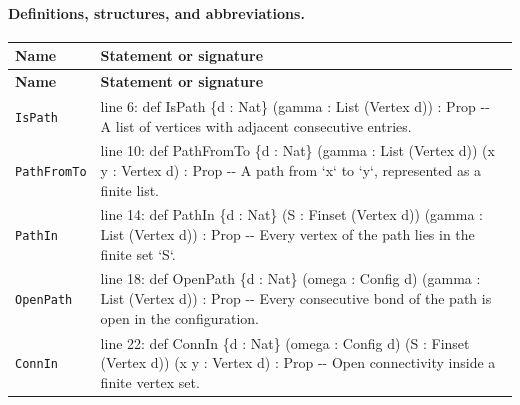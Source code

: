 \documentclass[10pt]{article}
\begin{document}
\paragraph{Definitions, structures, and abbreviations.}
\begin{longtable}{>{\raggedright\arraybackslash}p{} >{\raggedright\arraybackslash}p{}}
\textbf{Name} & \textbf{Statement or signature} \\
\hline
\endfirsthead
\textbf{Name} & \textbf{Statement or signature} \\
\hline
\endhead
\texttt{IsPath} & {\ttfamily\scriptsize line 6:\allowbreak{} def IsPath \{d :\allowbreak{} Nat\} (\allowbreak{}gamma :\allowbreak{} List (\allowbreak{}Vertex d)\allowbreak{})\allowbreak{} :\allowbreak{} Prop -\allowbreak{}-\allowbreak{} A list of vertices with adjacent consecutive entries.\allowbreak{}} \\[0.45em]
\texttt{PathFromTo} & {\ttfamily\scriptsize line 10:\allowbreak{} def PathFromTo \{d :\allowbreak{} Nat\} (\allowbreak{}gamma :\allowbreak{} List (\allowbreak{}Vertex d)\allowbreak{})\allowbreak{} (\allowbreak{}x y :\allowbreak{} Vertex d)\allowbreak{} :\allowbreak{} Prop -\allowbreak{}-\allowbreak{} A path from `x` to `y`,\allowbreak{} represented as a finite list.\allowbreak{}} \\[0.45em]
\texttt{PathIn} & {\ttfamily\scriptsize line 14:\allowbreak{} def PathIn \{d :\allowbreak{} Nat\} (\allowbreak{}S :\allowbreak{} Finset (\allowbreak{}Vertex d)\allowbreak{})\allowbreak{} (\allowbreak{}gamma :\allowbreak{} List (\allowbreak{}Vertex d)\allowbreak{})\allowbreak{} :\allowbreak{} Prop -\allowbreak{}-\allowbreak{} Every vertex of the path lies in the finite set `S`.\allowbreak{}} \\[0.45em]
\texttt{OpenPath} & {\ttfamily\scriptsize line 18:\allowbreak{} def OpenPath \{d :\allowbreak{} Nat\} (\allowbreak{}omega :\allowbreak{} Config d)\allowbreak{} (\allowbreak{}gamma :\allowbreak{} List (\allowbreak{}Vertex d)\allowbreak{})\allowbreak{} :\allowbreak{} Prop -\allowbreak{}-\allowbreak{} Every consecutive bond of the path is open in the configuration.\allowbreak{}} \\[0.45em]
\texttt{ConnIn} & {\ttfamily\scriptsize line 22:\allowbreak{} def ConnIn \{d :\allowbreak{} Nat\} (\allowbreak{}omega :\allowbreak{} Config d)\allowbreak{} (\allowbreak{}S :\allowbreak{} Finset (\allowbreak{}Vertex d)\allowbreak{})\allowbreak{} (\allowbreak{}x y :\allowbreak{} Vertex d)\allowbreak{} :\allowbreak{} Prop -\allowbreak{}-\allowbreak{} Open connectivity inside a finite vertex set.\allowbreak{}} \\[0.45em]
\end{longtable}
\end{document}
